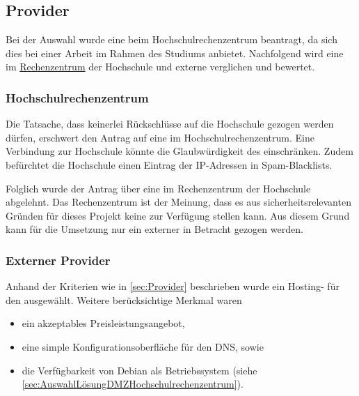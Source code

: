 \documentclass[a4paper,11pt,singlespacing]{article}
\begin{document}
	\subsection{Provider}\label{sec:AuswahlLösungProvider}
		Bei der  Auswahl wurde eine  beim Hochschulrechenzentrum beantragt, da sich dies bei einer Arbeit im Rahmen des Studiums anbietet.
		Nachfolgend wird eine  im \href{https://www.hs-weingarten.de/web/rechenzentrum}{Rechenzentrum} der Hochschule und externe  verglichen und bewertet.
		
		\subsubsection{Hochschulrechenzentrum}\label{sec:AuswahlLösungDMZHochschulrechenzentrum}
			Die Tatsache, dass keinerlei Rückschlüsse auf die Hochschule gezogen werden dürfen, erschwert den Antrag auf eine  im Hochschulrechenzentrum.
			Eine Verbindung zur Hochschule könnte die Glaubwürdigkeit des  einschränken.
			Zudem befürchtet die Hochschule einen Eintrag der IP-Adressen in Spam-Blacklists.

			Folglich wurde der Antrag über eine  im Rechenzentrum der Hochschule abgelehnt.
			Das Rechenzentrum ist der Meinung, dass es aus sicherheitsrelevanten Gründen für dieses Projekt keine  zur Verfügung stellen kann.
			Aus diesem Grund kann für die Umsetzung nur ein externer  in Betracht gezogen werden.

		\subsubsection{Externer Provider}\label{sec:AuswahlLösungExterneProvider}
			Anhand der Kriterien wie in \autoref{sec:Provider} beschrieben wurde ein Hosting- für den  ausgewählt.
			Weitere berücksichtige Merkmal waren
			\begin{itemize}
				\item ein akzeptables Preisleistungsangebot,
				\item eine simple Konfigurationsoberfläche für den DNS, sowie
				\item die Verfügbarkeit von Debian als Betriebssystem (siehe \autoref{sec:AuswahlLösungDMZHochschulrechenzentrum}).
			\end{itemize}		
\end{document}

